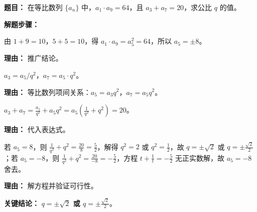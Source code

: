 \begin{examplebox}
\textbf{\textcolor{CExample}{题目：}} 在等比数列 $\{a_n\}$ 中，$a_1\cdot a_9 = 64$，且 $a_3 + a_7 = 20$，求公比 $q$ 的值。

\textbf{\textcolor{CExample}{解题步骤：}}
\begin{description}[style=nextline, leftmargin=2.8em, labelsep=0.5em, itemsep=0.45em]
    \item[\textbf{第一步（用结论求中间项）：}] 由 $1+9=10$，$5+5=10$，得 $a_1\cdot a_9 = a_5^2 = 64$，所以 $a_5 = \pm 8$。
    \par\textbf{理由：} 推广结论。
    \item[\textbf{第二步（表示另外两项）：}] $a_3 = a_5 / q^2$，$a_7 = a_5 \cdot q^2$。
    \par\textbf{理由：} 等比数列项间关系：$a_5 = a_3 q^2$，$a_7 = a_5 q^2$。
    \item[\textbf{第三步（代入求和）：}] $a_3 + a_7 = \frac{a_5}{q^2} + a_5 q^2 = a_5\left(\frac{1}{q^2}+q^2\right) = 20$。
    \par\textbf{理由：} 代入表达式。
    \item[\textbf{第四步（分类讨论）：}] 若 $a_5=8$，则 $\frac{1}{q^2}+q^2 = \frac{20}{8}=\frac{5}{2}$，解得 $q^2=2$ 或 $q^2=\frac{1}{2}$，故 $q=\pm\sqrt{2}$ 或 $q=\pm\frac{\sqrt{2}}{2}$；若 $a_5=-8$，则 $\frac{1}{q^2}+q^2 = \frac{20}{-8} = -\frac{5}{2}$，方程 $t+\frac{1}{t}=-\frac{5}{2}$ 无正实数解，故 $a_5=-8$ 舍去。
    \par\textbf{理由：} 解方程并验证可行性。
\end{description}

\textbf{\textcolor{CExample}{关键结论：}} \textbf{$q = \pm\sqrt{2}$ 或 $q = \pm\frac{\sqrt{2}}{2}$}。
\end{examplebox}
